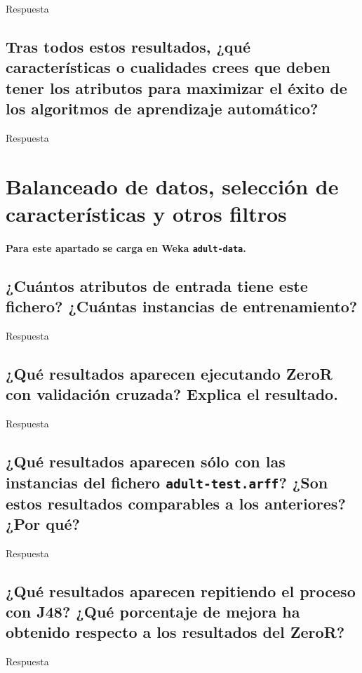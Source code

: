 \documentclass[12pt]{article}
\begin{document}
Respuesta

\subsection{\small Tras todos estos resultados, ¿qué características o
cualidades crees que deben tener los atributos para maximizar el éxito de los
algoritmos de aprendizaje automático?}

Respuesta

\newpage

\section{Balanceado de datos, selección de características y otros filtros}

\paragraph{\small Para este apartado se carga en Weka \texttt{adult-data}.}

\subsection{\small ¿Cuántos atributos de entrada tiene este fichero? ¿Cuántas
instancias de entrenamiento?}

Respuesta

\subsection{\small ¿Qué resultados aparecen ejecutando ZeroR con validación
cruzada? Explica el resultado.}

Respuesta

\subsection{\small ¿Qué resultados aparecen sólo con las instancias del fichero
\texttt{adult-test.arff}? ¿Son estos resultados comparables a los anteriores?
¿Por qué?}

Respuesta

\subsection{\small ¿Qué resultados aparecen repitiendo el proceso con J48?
¿Qué porcentaje de mejora ha obtenido respecto a los resultados del ZeroR?}

Respuesta
\end{document}
